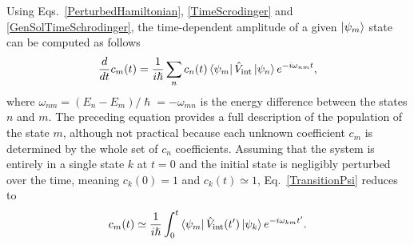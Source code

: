 

Using Eqs.\ \ref{PerturbedHamiltonian}, \ref{TimeScrodinger} and \ref{GenSolTimeSchrodinger}, the time-dependent amplitude of a given $\ket{\psi_m}$ state can be computed as follows
\begin{eqnarray}
\frac{d }{d t} c_m (t) = \frac{1}{i \hslash} \sum_n c_n (t) \bra{\psi_m} \hat{V}_\text{int} \ket{\psi_n} e^{-i \omega_{nm} t},
\label{TransitionPsi}
\end{eqnarray}
where $\omega_{nm} = (E_n - E_m) / \hslash = - \omega_{mn}$ is the energy difference between the states $n$ and $m$. The preceding equation provides a full description of the population of the state $m$, although not practical because each unknown coefficient $c_m$ is determined by the whole set of $c_n$ coefficients. Assuming that the system is entirely in a single state $k$ at $t = 0$ and the initial state is negligibly perturbed over the time, meaning $c_k(0) = 1$ and $c_k(t) \simeq 1$, Eq.\ \ref{TransitionPsi} reduces to\!\cite{Sakurai1994}
\begin{eqnarray}
c_m (t) \simeq \frac{1}{i \hslash} \int_0^t \bra{\psi_m} \hat{V}_\text{int} (t') \ket{\psi_k} e^{-i \omega_{km} t'}.
\label{TransitionPsi2}
\end{eqnarray}

